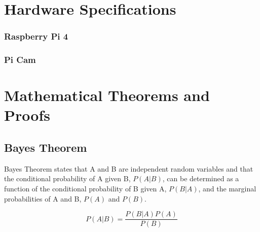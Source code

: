 \begin{appendices}

    \chapter{Hardware Specifications}
    \label{appendices:hardware_specs}
        \subsection{Raspberry Pi 4}


        \subsection{Pi Cam}






    \chapter{Mathematical Theorems and Proofs}
    \label{appendices:math_theorems}
    \section{Bayes Theorem}
    \label{section:bayes}

    Bayes Theorem states that A and B are independent random variables and that the conditional probability of A given B, $P(A|B)$, can be determined as a function of the conditional probability of B given A, $P(B|A)$, and the marginal probabilities of A and B, $P(A)$ and $P(B)$.

    
    \begin{equation}
        P(A|B) = \frac{P(B|A)P(A)}{P(B)}
        \label{eq:bayes}
    \end{equation}

\end{appendices}